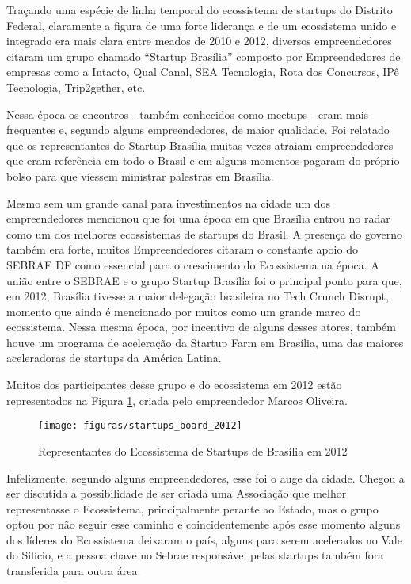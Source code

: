 Traçando uma espécie de linha temporal do ecossistema de startups do Distrito Federal, claramente a figura de uma forte liderança e de um ecossistema unido e integrado era mais clara entre meados de 2010 e 2012, diversos empreendedores citaram um grupo chamado ``Startup Brasília'' composto por Empreendedores de empresas como a Intacto, Qual Canal, SEA Tecnologia, Rota dos Concursos, IPê Tecnologia, Trip2gether, etc. 

Nessa época os encontros - também conhecidos como meetups - eram mais frequentes e, segundo alguns empreendedores, de maior qualidade. Foi relatado que os representantes do Startup Brasília muitas vezes atraiam empreendedores que eram referência em todo o Brasil e em alguns momentos pagaram do próprio bolso para que víessem ministrar palestras em Brasília.

Mesmo sem um grande canal para investimentos na cidade um dos empreendedores mencionou que foi uma época em que Brasília entrou no radar como um dos melhores ecossistemas de startups do Brasil. A presença do governo também era forte, muitos Empreendedores citaram o constante apoio do SEBRAE DF como essencial para o crescimento do Ecossistema na época. A união entre o SEBRAE e o grupo Startup Brasília foi o principal ponto para que, em 2012, Brasília tivesse a maior delegação brasileira no Tech Crunch Disrupt, momento que ainda é mencionado por muitos como um grande marco do ecossistema. Nessa mesma época, por incentivo de alguns desses atores, também houve um programa de aceleração da Startup Farm em Brasília, uma das maiores aceleradoras de startups da América Latina.

Muitos dos participantes desse grupo e do ecossistema em 2012 estão representados na Figura \ref{figure:startups_board_2012}, criada pelo empreendedor Marcos Oliveira.

\begin{figure}[!htb]
	\centering
	\texttt{[image: figuras/startups\_board\_2012]}
	\caption{Representantes do Ecossistema de Startups de Brasília em 2012}
	\label{figure:startups_board_2012}
\end{figure}

Infelizmente, segundo alguns empreendedores, esse foi o auge da cidade. Chegou a ser discutida a possibilidade de ser criada uma Associação que melhor representasse o Ecossistema, principalmente perante ao Estado, mas o grupo optou por não seguir esse caminho e coincidentemente após esse momento alguns dos líderes do Ecossistema deixaram o país, alguns para serem acelerados no Vale do Silício, e a pessoa chave no Sebrae responsável pelas startups também fora transferida para outra área. 


